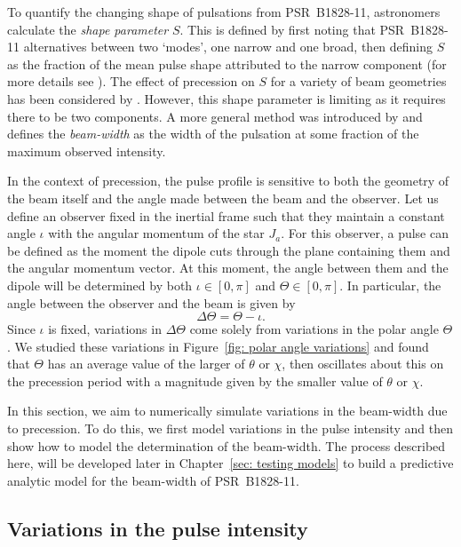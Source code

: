 \documentclass[../full_thesis/full_thesis.tex]{subfiles}
\begin{document}
To quantify the changing shape of pulsations from PSR~B1828-11, astronomers
calculate the \emph{shape parameter} $S$. This is defined by first noting that
PSR~B1828-11 alternatives between two `modes', one narrow and one broad, then
defining $S$ as the fraction of the mean pulse shape attributed to the narrow
component (for more details see \citet{Stairs2003}). The effect of
precession on $S$ for a variety of beam geometries has been considered by
\citet{Akgun2006}.  However, this shape parameter is limiting as it requires
there to be two components.  A more general method was introduced by
\citet{Lyne2010} and defines the \emph{beam-width} as the width of the
pulsation at some fraction of the maximum observed intensity.

In the context of precession, the pulse profile is sensitive to both the
geometry of the beam itself and the angle made between the beam and the
observer.  Let us define an observer fixed in the inertial frame such that they
maintain a constant angle $\iota$ with the angular momentum of the star $J_a$.
For this observer, a pulse can be defined as the moment the dipole cuts through
the plane containing them and the angular momentum vector. At this moment, the
angle between them and the dipole will be determined by both $\iota \in [0, \pi]$ and
$\Theta \in [0, \pi]$. In particular, the angle between the observer and the beam
is given by
\begin{equation}
\Delta\Theta = \Theta - \iota.
\label{eqn: delta Theta}
\end{equation}
Since $\iota$ is fixed, variations in $\Delta\Theta$ come solely from
variations in the polar angle $\Theta$. We studied these variations in
Figure~\ref{fig: polar angle variations} and found that $\Theta$ has an
average value of the larger of $\theta$ or $\chi$, then oscillates about this
on the precession period with a magnitude given by the smaller value of
$\theta$ or $\chi$.

In this section, we aim to numerically simulate variations in the beam-width
due to precession. To do this, we first model variations in the pulse intensity
and then show how to model the determination of the beam-width. The process
described here, will be developed later in Chapter~\ref{sec: testing models} to
build a predictive analytic model for the beam-width of PSR~B1828-11.

\subsection{Variations in the pulse intensity}
\end{document}
